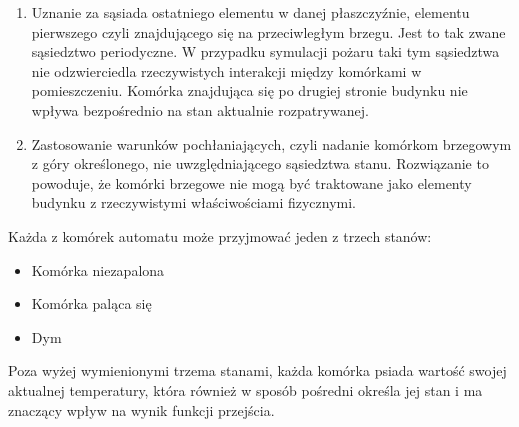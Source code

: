 \begin {enumerate}
\item Uznanie za sąsiada ostatniego elementu w danej płaszczyźnie, elementu pierwszego czyli znajdującego się na przeciwległym brzegu. Jest to tak zwane sąsiedztwo
periodyczne. W przypadku symulacji pożaru taki tym sąsiedztwa nie odzwierciedla rzeczywistych interakcji między komórkami w pomieszczeniu. Komórka znajdująca się 
po drugiej stronie budynku nie wpływa bezpośrednio na stan aktualnie rozpatrywanej.
\item Zastosowanie warunków pochłaniających, czyli nadanie komórkom brzegowym z góry określonego, nie uwzględniającego sąsiedztwa stanu. Rozwiązanie to 
powoduje, że komórki brzegowe nie mogą być traktowane jako elementy budynku z rzeczywistymi właściwościami fizycznymi.
\end{enumerate}

Każda z komórek automatu może przyjmować jeden z trzech stanów:
\begin{itemize}
\item Komórka niezapalona
\item Komórka paląca się
\item Dym
\end{itemize}
Poza wyżej wymienionymi trzema stanami, każda komórka psiada wartość swojej aktualnej temperatury, która również w sposób pośredni określa jej stan i ma znaczący
wpływ na wynik funkcji przejścia.

